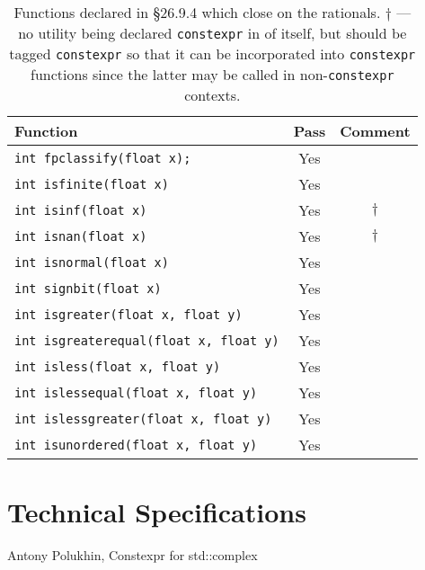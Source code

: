 \documentclass[prd,preprint,amsmath,amssymb,nofootinbib,eqsecnum]{revtex4-1}
\newcommand{\constexpr}{\code{constexpr}\xspace}
\newcommand{\code}[1]{{\tt #1}}
\begin{document}
\begin{table}[h]
	\begin{tabular}{lcc}
		Function & Pass & Comment
	\\
	\hline \hline
		\code{int fpclassify(float x);} & Yes &
	\\
	\hline
		\code{int isfinite(float x)} & Yes &
	\\
	\hline
		\code{int isinf(float x)} & Yes & $\dagger$
	\\
	\hline
		\code{int isnan(float x)} & Yes & $\dagger$ 
	\\
	\hline
		\code{int isnormal(float x)} & Yes &
	\\
	\hline
		\code{int signbit(float x)} & Yes &
	\\
	\hline
		\code{int isgreater(float x, float y)} & Yes &
	\\
	\hline
		\code{int isgreaterequal(float x, float y)} & Yes &
	\\
	\hline
		\code{int isless(float x, float y)} & Yes &
	\\
	\hline
		\code{int islessequal(float x, float y)} & Yes &
	\\
	\hline
		\code{int islessgreater(float x, float y)} & Yes &
	\\
	\hline
		\code{int isunordered(float x, float y)} & Yes &
	\end{tabular}
\caption{Functions declared in \S 26.9.4 which close on the rationals. $\dagger$ --- no utility being declared \constexpr in of itself, but should be tagged \constexpr so that it can be incorporated into \constexpr functions since the latter may be called in  non-\constexpr contexts.}
\label{tab:26.9.4}
\end{table}

\section{Technical Specifications}


\begin{thebibliography}{1}
	 Antony Polukhin, Constexpr for std::complex
\end{thebibliography}
\end{document}
